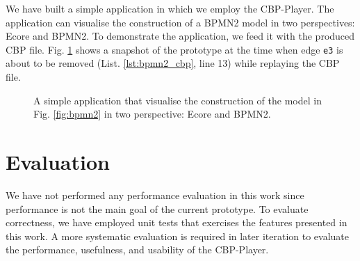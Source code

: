 \documentclass[conference]{IEEEtran}
\begin{document}
We have built a simple application in which we employ the CBP-Player. 
The application can visualise the construction of a BPMN2 model in two perspectives: Ecore and BPMN2. 
To demonstrate the application, we feed it with the produced CBP file. 
Fig. \ref{fig:prototype} shows a snapshot of the prototype at the time when edge \texttt{e3} 
is about to be removed (List. \ref{lst:bpmn2_cbp}, line 13) while replaying the CBP file.

\begin{figure}[h]
    \caption{A simple application that visualise the construction of the model in Fig. \ref{fig:bpmn2} in two perspective:
        Ecore and BPMN2.}
    \label{fig:prototype}
\end{figure}

\section{Evaluation}
\label{sec:evaluation}
We have not performed any performance evaluation in this work 
since performance is not the main goal of the current prototype.
To evaluate correctness, we have employed unit tests that exercises the features 
presented in this work. A more systematic evaluation is required in later iteration 
to evaluate the performance, usefulness, and usability of the CBP-Player.
\end{document}
